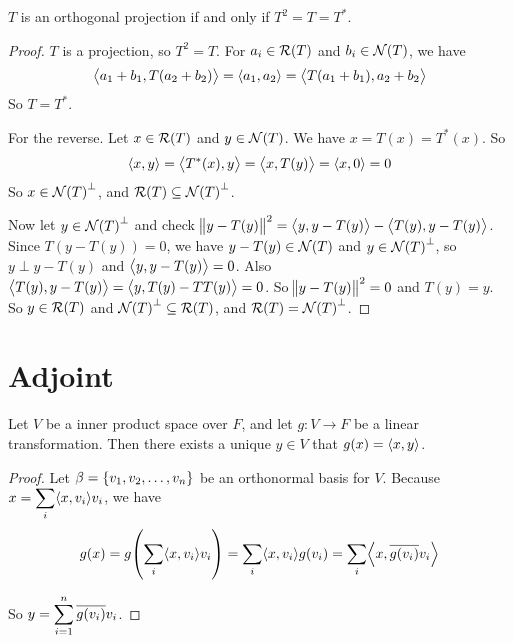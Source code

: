 \begin{theorem}
    $T$ is an orthogonal projection if and only if $T^2 = T = T^*$.
\end{theorem}
\begin{proof}
    $T$ is a projection, so $T^2 = T$. For $a_i \in \rangespace{T}$ and $b_i \in \nullspace{T}$, we have 
    \begin{equation*}
        \innerproduct{a_1 + b_1}{T(a_2 + b_2)} = \innerproduct{a_1}{a_2} = \innerproduct{T(a_1 + b_1)}{a_2 + b_2}
    \end{equation*}
    So $T = T^*$.
    
    For the reverse. Let $x \in \rangespace{T}$ and $y \in \nullspace{T}$. We have $x = T(x) = T^*(x)$. So
    \begin{equation*}
        \innerproduct{x}{y} = \innerproduct{T^*(x)}{y} = \innerproduct{x}{T(y)} = \innerproduct{x}{0} = 0
    \end{equation*}
    So $x \in \nullspace{T}^\perp$, and $\rangespace{T} \subseteq \nullspace{T}^\perp$.
    
    Now let $y \in \nullspace{T}^\perp$ and check $\norm{y - T(y)}^2 = \innerproduct{y}{y - T(y)} - \innerproduct{T(y)}{y - T(y)}$. Since $T(y - T(y)) = 0$, we have $y - T(y) \in \nullspace{T}$ and $y \in \nullspace{T}^\perp$, so $y \perp y - T(y)$ and $\innerproduct{y}{y - T(y)} = 0$. Also $\innerproduct{T(y)}{y - T(y)} = \innerproduct{y}{T(y) - TT(y)} = 0$. So $\norm{y - T(y)}^2 = 0$ and $T(y) = y$. So $y \in \rangespace{T}$ and $\nullspace{T}^\perp \subseteq \rangespace{T}$, and $\rangespace{T} = \nullspace{T}^\perp$.
\end{proof}


\section{Adjoint}

\begin{theorem}\label{eiesz_representation_theorem}
Let $V$ be a inner product space over $F$, and let $g: V \rightarrow F$ be a linear transformation. Then there exists a unique $y \in V$ that $g(x) = \innerproduct{x}{y}$.
\end{theorem}
\begin{proof}
    Let $\beta = \set{v_1, v_2, \dots, v_n}$ be an orthonormal basis for $V$. Because $\displaystyle x = \sum_i \innerproduct{x}{v_i}v_i$, we have
    \begin{equation}
        g(x) = g\mleft(\sum_i \innerproduct{x}{v_i}v_i \mright) = \sum_i \innerproduct{x}{v_i}g(v_i) = \sum_i \innerproduct{x}{\conjugate{g(v_i)}v_i}
    \end{equation}
    
    So $\displaystyle y = \sum_{i=1}^n \overline{g(v_i)} v_i$.
\end{proof}


